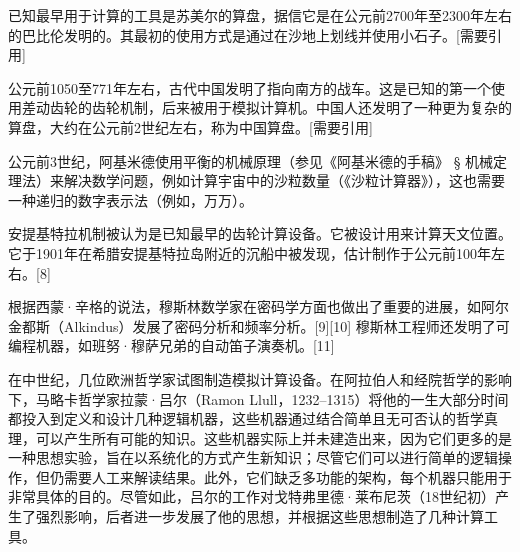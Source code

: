 已知最早用于计算的工具是苏美尔的算盘，据信它是在公元前2700年至2300年左右的巴比伦发明的。其最初的使用方式是通过在沙地上划线并使用小石子。[需要引用]

公元前1050至771年左右，古代中国发明了指向南方的战车。这是已知的第一个使用差动齿轮的齿轮机制，后来被用于模拟计算机。中国人还发明了一种更为复杂的算盘，大约在公元前2世纪左右，称为中国算盘。[需要引用]

公元前3世纪，阿基米德使用平衡的机械原理（参见《阿基米德的手稿》 § 机械定理法）来解决数学问题，例如计算宇宙中的沙粒数量（《沙粒计算器》），这也需要一种递归的数字表示法（例如，万万）。  

安提基特拉机制被认为是已知最早的齿轮计算设备。它被设计用来计算天文位置。它于1901年在希腊安提基特拉岛附近的沉船中被发现，估计制作于公元前100年左右。[8]

根据西蒙·辛格的说法，穆斯林数学家在密码学方面也做出了重要的进展，如阿尔金都斯（Alkindus）发展了密码分析和频率分析。[9][10] 穆斯林工程师还发明了可编程机器，如班努·穆萨兄弟的自动笛子演奏机。[11]

在中世纪，几位欧洲哲学家试图制造模拟计算设备。在阿拉伯人和经院哲学的影响下，马略卡哲学家拉蒙·吕尔（Ramon Llull，1232–1315）将他的一生大部分时间都投入到定义和设计几种逻辑机器，这些机器通过结合简单且无可否认的哲学真理，可以产生所有可能的知识。这些机器实际上并未建造出来，因为它们更多的是一种思想实验，旨在以系统化的方式产生新知识；尽管它们可以进行简单的逻辑操作，但仍需要人工来解读结果。此外，它们缺乏多功能的架构，每个机器只能用于非常具体的目的。尽管如此，吕尔的工作对戈特弗里德·莱布尼茨（18世纪初）产生了强烈影响，后者进一步发展了他的思想，并根据这些思想制造了几种计算工具。